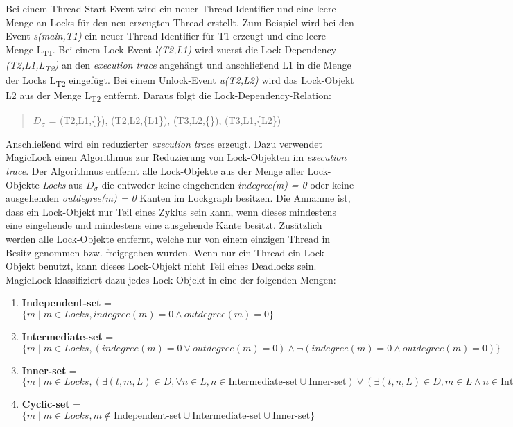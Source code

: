 Bei einem Thread-Start-Event wird ein neuer Thread-Identifier und eine leere Menge an Locks für den neu erzeugten Thread erstellt. Zum Beispiel wird bei den Event \textit{s(main,T1)} ein neuer Thread-Identifier für T1 erzeugt und eine leere Menge L\textsubscript{T1}. Bei einem Lock-Event \textit{l(T2,L1)} wird zuerst die Lock-Dependency \textit{(T2,L1,L\textsubscript{T2})} an den \textit{execution trace} angehängt und anschließend L1 in die Menge der Locks L\textsubscript{T2} eingefügt. Bei einem Unlock-Event \textit{u(T2,L2)} wird das Lock-Objekt L2 aus der Menge L\textsubscript{T2} entfernt. Daraus folgt die Lock-Dependency-Relation:
\begin{quote}
  \textbf{$D_\sigma$} = (T2,L1,\{\}), (T2,L2,\{L1\}), (T3,L2,\{\}), (T3,L1,\{L2\})
\end{quote}
Anschließend wird ein reduzierter \textit{execution trace} erzeugt. Dazu verwendet MagicLock einen Algorithmus zur Reduzierung von Lock-Objekten im \textit{execution trace}. Der Algorithmus entfernt alle Lock-Objekte aus der Menge aller Lock-Objekte \textit{Locks} aus \textit{$D_\sigma$} die entweder keine eingehenden \textit{indegree(m) = 0} oder keine ausgehenden \textit{outdegree(m) = 0} Kanten im Lockgraph besitzen. Die Annahme ist, dass ein Lock-Objekt nur Teil eines Zyklus sein kann, wenn dieses mindestens eine eingehende und mindestens eine ausgehende Kante besitzt. Zusätzlich werden alle Lock-Objekte entfernt, welche nur von einem einzigen Thread in Besitz genommen bzw. freigegeben wurden. Wenn nur ein Thread ein Lock-Objekt benutzt, kann dieses Lock-Objekt nicht Teil eines Deadlocks sein. MagicLock klassifiziert dazu jedes Lock-Objekt in eine der folgenden Mengen:
\begin{enumerate}
  \item \textbf{Independent-set} = $\{m \mid m \in Locks, indegree(m) = 0 \land outdegree(m) = 0\}$
  \item \textbf{Intermediate-set} = $\{m \mid m \in Locks, (indegree(m) = 0 \lor outdegree(m) = 0) \land \lnot (indegree(m) = 0 \land outdegree(m) = 0)\}$
  \item \textbf{Inner-set} = $\{m \mid m \in Locks, (\exists (t,m,L) \in D, \forall n \in L, n \in \text{Intermediate-set} \cup \text{Inner-set}) \lor (\exists (t,n,L) \in D, m \in L \land n \in \text{Intermediate-set} \cup \text{Inner-set})\}$
  \item \textbf{Cyclic-set} = $\{m \mid m \in Locks, m \notin \text{Independent-set} \cup \text{Intermediate-set} \cup \text{Inner-set}\}$
\end{enumerate}